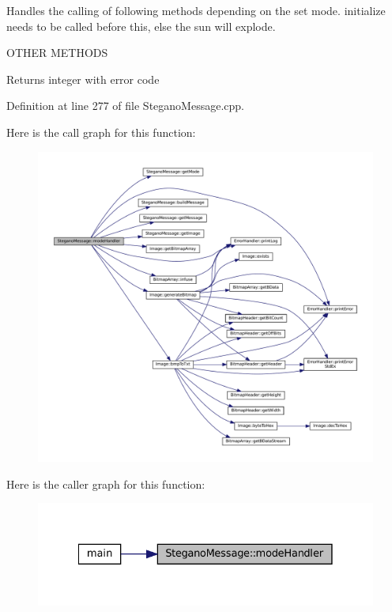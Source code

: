 Handles the calling of following methods depending on the set mode. initialize needs to be called before this, else the sun will explode. 

O\+T\+H\+ER M\+E\+T\+H\+O\+DS\begin{DoxyReturn}{Returns}
integer with error code 
\end{DoxyReturn}


Definition at line 277 of file Stegano\+Message.\+cpp.

Here is the call graph for this function\+:
\nopagebreak
\begin{figure}[H]
\begin{center}
\leavevmode
\includegraphics[width=350pt]{classSteganoMessage_a2649e515941e730520b759282d00dcd6_cgraph}
\end{center}
\end{figure}
Here is the caller graph for this function\+:
\nopagebreak
\begin{figure}[H]
\begin{center}
\leavevmode
\includegraphics[width=328pt]{classSteganoMessage_a2649e515941e730520b759282d00dcd6_icgraph}
\end{center}
\end{figure}
\mbox{\label{classSteganoMessage_a3ea3f5ff720bf56d33f168d47e2897b0}} 
